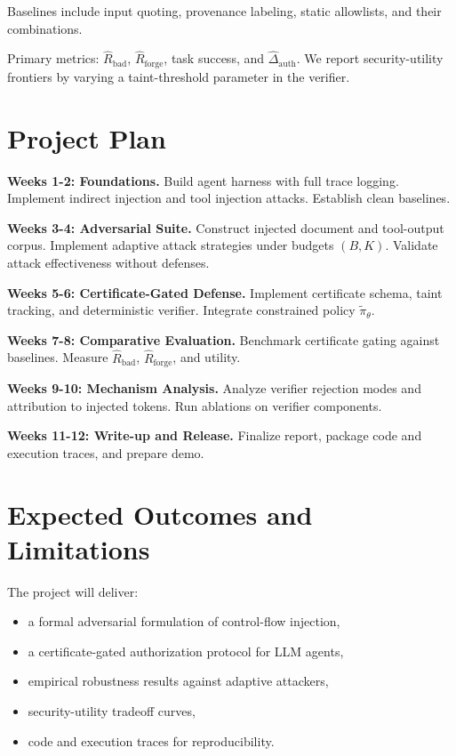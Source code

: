 \documentclass[9pt]{article}
\begin{document}
Baselines include input quoting, provenance labeling, static allowlists, and their combinations.

Primary metrics:
$\widehat{R}_{\mathrm{bad}}$, $\widehat{R}_{\mathrm{forge}}$, task success, and $\widehat{\Delta}_{\text{auth}}$.
We report security-utility frontiers by varying a taint-threshold parameter in the verifier.

\section{Project Plan}

\textbf{Weeks 1-2: Foundations.}
Build agent harness with full trace logging.
Implement indirect injection and tool injection attacks.
Establish clean baselines.

\textbf{Weeks 3-4: Adversarial Suite.}
Construct injected document and tool-output corpus.
Implement adaptive attack strategies under budgets $(B,K)$.
Validate attack effectiveness without defenses.

\textbf{Weeks 5-6: Certificate-Gated Defense.}
Implement certificate schema, taint tracking, and deterministic verifier.
Integrate constrained policy $\tilde{\pi}_\theta$.

\textbf{Weeks 7-8: Comparative Evaluation.}
Benchmark certificate gating against baselines.
Measure $\widehat{R}_{\mathrm{bad}}$, $\widehat{R}_{\mathrm{forge}}$, and utility.

\textbf{Weeks 9-10: Mechanism Analysis.}
Analyze verifier rejection modes and attribution to injected tokens.
Run ablations on verifier components.


\textbf{Weeks 11-12: Write-up and Release.}
Finalize report, package code and execution traces, and prepare demo.

\section{Expected Outcomes and Limitations}

The project will deliver:

\begin{itemize}[leftmargin=1.2em]
\item a formal adversarial formulation of control-flow injection,
\item a certificate-gated authorization protocol for LLM agents,
\item empirical robustness results against adaptive attackers,
\item security-utility tradeoff curves,
\item code and execution traces for reproducibility.
\end{itemize}
\end{document}
